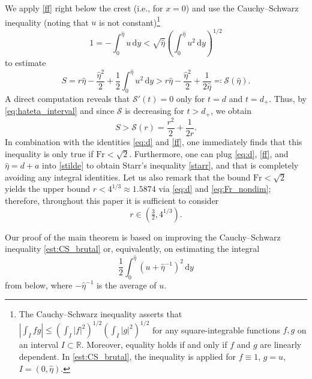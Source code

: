 \documentclass{amsart}
\theoremstyle{definition}
\newcommand{\R}{\mathbb R}
\newcommand{\dd}{\mathrm d}
\newcommand{\Fr}{\textrm{Fr}}
\begin{document}
We apply \eqref{ff} right below the crest (i.e., for $x=0$) and use the Cauchy--Schwarz inequality (noting that $u$ is not constant)\footnote{The Cauchy--Schwarz inequality asserts that $|\int_I fg|\le(\int_I|f|^2)^{1/2}(\int_I|g|^2)^{1/2}$ for any square-integrable functions $f,g$ on an interval $I\subset\R$. Moreover, equality holds if and only if $f$ and $g$ are linearly dependent. In \eqref{est:CS_brutal}, the inequality is applied for $f\equiv1$, $g=u$, $I=(0,\hat\eta)$.}
\begin{equation}\label{est:CS_brutal}
	1=-\int_0^{\hat\eta}u\,\dd y<\sqrt{\hat\eta}\left(\int_0^{\hat\eta}u^2\,\dd y\right)^{1/2}
\end{equation}
to estimate
\begin{equation}\label{stilde}
	S = r\hat\eta - \frac{\hat\eta^2}{2} + \frac12 \int_0^{\hat\eta} u^2\,\dd y > r \hat{\eta} - \frac{\hat{\eta}^2}{2} + \frac{1}{2 \hat{\eta}} \eqqcolon \mathcal{S}(\hat{\eta}).
\end{equation}
A direct computation reveals that $\mathcal{S}'(t) = 0$ only for $t = d$ and $t = d_+$. Thus, by \eqref{eq:hateta_interval} and since $\mathcal{S}$ is decreasing for $t > d_+$, we obtain 
\begin{equation} \label{eq:intro:S}
	S > \mathcal{S}(r) = \frac{r^2}{2} + \frac{1}{2r}.
\end{equation}
In combination with the identities \eqref{eq:d} and \eqref{ff}, one immediately finds that this inequality is only true if $\Fr < \sqrt{2}$. Furthermore, one can plug \eqref{eq:d}, \eqref{ff}, and $\hat{\eta} = d + a$ into \eqref{stilde} to obtain Starr's inequality \eqref{starr}, and that is completely avoiding any integral identities. Let us also remark that the bound $\Fr<\sqrt2$ yields the upper bound $r< 4^{1/3}\approx 1.5874$ via \eqref{eq:d} and \eqref{eq:Fr_nondim}; therefore, throughout this paper it is sufficient to consider
\begin{equation}\label{range_r}
	r\in (\tfrac32, 4^{1/3}).
\end{equation}

Our proof of the main theorem is based on improving the Cauchy--Schwarz inequality \eqref{est:CS_brutal} or, equivalently, on estimating the integral
\begin{equation}\label{int:u-average}
	\frac12 \int_0^{\hat{\eta}} \left( u + \hat{\eta}^{-1} \right)^2 \, \dd y
\end{equation}
from below, where $-\hat\eta^{-1}$ is the average of $u$.
\end{document}
